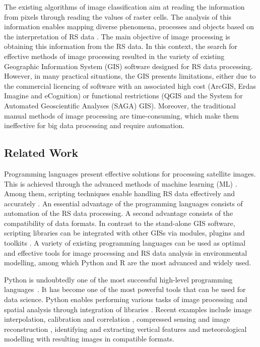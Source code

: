 \documentclass[jimaging,article,accept,pdftex,moreauthors]{Definitions/mdpi}
\begin{document}
{The existing }algorithms of image classification{ aim at reading the information from pixels through reading the }values{ of} raster cells. The analysis of this information enables mapping{ }diverse phenomena, processes and objects based on {the} interpretation of {RS} data \cite{PERIN2021106694,PAHLEVAN2022112860,Lemenkova202141,ABU2021107863,ATTOUMANE2022103285}. The main objective of image processing is {obtaining} this information from the {RS} data{. }In this context, the search for effective methods of image processing resulted in the variety of existing Geographic Information System (GIS) software{ designed }for {RS} data processing. However, in many practical situations, the GIS presents limitations, either due to the commercial licencing of software {with} an associated high cost {(}ArcGIS, Erdas Imagine and eCognition) or functional restrictions (QGIS and the System for Automated Geoscientific Analyses (SAGA) GIS). Moreover, the {traditional manual }methods{ of image processing are time-consuming, which make them ineffective for big} data processing {and require automation}. 

\subsection{Related Work}

Programming {languages} present{ }effective solutions {for processing} satellite images{. This is achieved through the} advanced methods of machine learning (ML) \cite{MASOLELE2021112600,9066075,MARTINS2022113203,rs71114876}. Among them, scripting techniques enable handling {RS} data effectively and accurately{ }\cite{6344536,ELLEFSEN20191171,Lemenkova202212,6910592,Lemenkova202215,4160259}. {An }essential advantage of the programming languages consists of {automation of the RS data processing. A second advantage consists of the }compatibility{ of data formats}. In contrast to the stand-alone GIS software, scripting libraries can be integrated with other GISs via modules, plugins and toolkits \cite{6407912,7378577,VOS2019104528}. A variety of existing programming languages {can be used as} optimal and effective tools{ }for image processing and {RS} data analysis in environmental modelling,{ among which Python and R are the most advanced and widely used.}

Python is undoubtedly one of the most successful high-level programming languages~\cite{van1995python}. It has become one of the most powerful tools that can be used for data science. {Python} enables performing various tasks of image processing and spatial analysis through integration {of libraries} \cite{1247428,Rey2010PySALAP,Rey2010}. Recent examples include image interpolation, calibration and correlation \cite{DEDEUSFILHO2022101131}, compressed sensing and image reconstruction \cite{FARRENS2020100402}, identifying and extracting vertical features \cite{GAO2022105503} and meteorological modelling \cite{6528254} with resulting images in compatible formats. 
\end{document}
